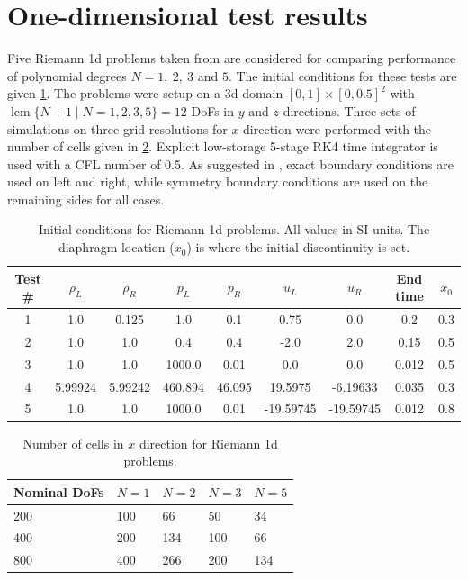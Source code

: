 \documentclass[a4paper,11pt,oneside]{article}
\newcommand{\citear}[1]{\citeauthor{#1} \cite{#1}} %
\DeclareMathOperator{\lcm}{lcm} %
\begin{document}
\section{One-dimensional test results}
\label{sec:1d_tests}

Five Riemann 1d problems taken from \citear{toro2009} are considered for comparing performance of polynomial degrees $N=1,\ 2,\ 3$ and $5$. The initial conditions for these tests are given \cref{tab:ic_riemann1d}. The problems were setup on a 3d domain $[0,1] \times [0,0.5]^2$ with $\lcm \{N+1 \mid N=1,2,3,5\}=12$ DoFs in $y$ and $z$ directions. Three sets of simulations on three grid resolutions for $x$ direction were performed with the number of cells given in \cref{tab:nx_riemann1d}. Explicit low-storage 5-stage RK4 time integrator \cite{kennedyCarpenterLewis2000} is used with a CFL number of 0.5. As suggested in \cite{mengaldoDeGraziaPeiro2014}, exact boundary conditions are used on left and right, while symmetry boundary conditions are used on the remaining sides for all cases.

\begin{table}[htbp]
	\centering
	\caption{Initial conditions for Riemann 1d problems. All values in SI units. The diaphragm location ($x_0$) is where the initial discontinuity is set.}
	\label{tab:ic_riemann1d}
	\begin{tabular}{c c c c c c c c c}
		\toprule
		Test \# & $\rho_L$ & $\rho_R$ & $p_L$ & $p_R$ & $u_L$ & $u_R$ & End time & $x_0$ \\ \midrule
		1 & 1.0 & 0.125 & 1.0 & 0.1 & 0.75 & 0.0 & 0.2 & 0.3 \\
		2 & 1.0 & 1.0 & 0.4 & 0.4 & -2.0 & 2.0 & 0.15 & 0.5 \\
		3 & 1.0 & 1.0 & 1000.0 & 0.01 & 0.0 & 0.0 & 0.012 & 0.5 \\
		4 & 5.99924 & 5.99242 & 460.894 & 46.095 & 19.5975 & -6.19633 & 0.035 & 0.3 \\
		5 & 1.0 & 1.0 & 1000.0 & 0.01 & -19.59745 & -19.59745 & 0.012 & 0.8 \\
		\bottomrule
	\end{tabular}
\end{table}

\begin{table}[htbp]
\centering
\caption{Number of cells in $x$ direction for Riemann 1d problems.}
\label{tab:nx_riemann1d}
\begin{tabular}{lllll}
	\toprule
	Nominal DoFs & $N=1$ & $N=2$ & $N=3$ & $N=5$\\
	\midrule
	200 & 100 & 66 & 50 & 34 \\
	400 & 200 & 134 & 100 & 66 \\
	800 & 400 & 266 & 200 & 134 \\
	\bottomrule
\end{tabular}
\end{table}
\end{document}
